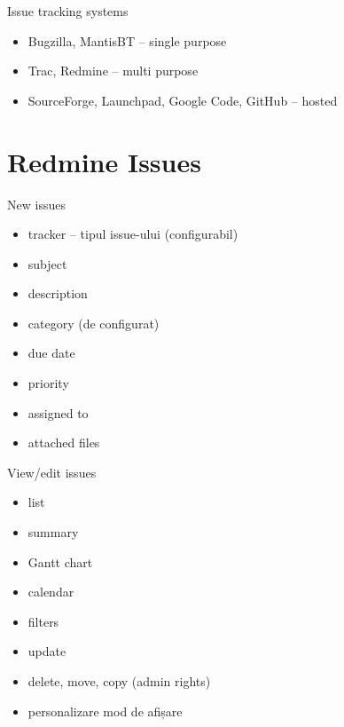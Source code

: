 \documentclass{beamer}
\begin{document}
\begin{frame}{Issue tracking systems}
  \begin{itemize}
    \item Bugzilla, MantisBT -- single purpose
    \item Trac, Redmine -- multi purpose
    \item SourceForge, Launchpad, Google Code, GitHub -- hosted
  \end{itemize}
\end{frame}

\section{Redmine Issues}

\begin{frame}{New issues}
  \begin{itemize}
    \item tracker -- tipul issue-ului (configurabil)
    \item subject
    \item description
    \item category (de configurat)
    \item due date
    \item priority
    \item assigned to
    \item attached files
  \end{itemize}
\end{frame}

\begin{frame}{View/edit issues}
  \begin{itemize}
    \item list
    \item summary
    \item Gantt chart
    \item calendar
    \item filters
    \item update
    \item delete, move, copy (admin rights)
    \item personalizare mod de afișare
  \end{itemize}
\end{frame}
\end{document}
